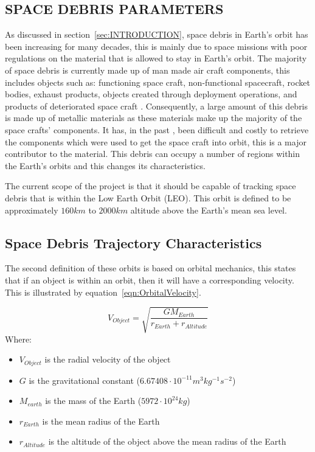 \documentclass[11pt]{witseiepaper}
\begin{document}
\begin{bibunit}[witseie]
\section{SPACE DEBRIS PARAMETERS} \label{sec:SpaceDebrisParameters}
As discussed in section~\ref{sec:INTRODUCTION}, space debris in Earth's orbit has been increasing for many decades, this is mainly due to space missions with poor regulations on the material that is allowed to stay in Earth's orbit.
The majority of space debris is currently made up of man made air craft components, this includes objects such as: functioning space craft, non-functional spacecraft, rocket bodies, exhaust products, objects created through deployment operations, and products of deteriorated space craft \cite{OrbitalDebrisTechnicalAssessment}.
Consequently, a large amount of this debris is made up of metallic materials as these materials make up the majority of the space crafts' components.
It has, in the past \cite{Spacex}, been difficult and costly to retrieve the components which were used to get the space craft into orbit, this is a major contributor to the material.
This debris can occupy a number of regions within the Earth's orbits and this changes its characteristics.

The current scope of the project is that it should be capable of tracking space debris that is within the Low Earth Orbit (LEO). This orbit is defined to be approximately $160 km$ to $2000 km$ altitude above the Earth's mean sea level.


\subsection{Space Debris Trajectory Characteristics} \label{sec:SpaceDebrisTrajectoryCharacteristics}
The second definition of these orbits is based on orbital mechanics, this states that if an object is within an orbit, then it will have a corresponding velocity.
This is illustrated by equation~\ref{eqn:OrbitalVelocity}. 

\begin{equation} \label{eqn:OrbitalVelocity}
    V_{Object} = \sqrt{\frac{G M_{Earth}}{r_{Earth} + r_{Altitude}}}
\end{equation}
Where:
\begin{itemize}
    \item $V_{Object}$ is the radial velocity of the object
    \item $G$ is the gravitational constant ($6.67408 \cdot 10^{-11} m^3 kg^{-1} s^{-2}$)
    \item $M_{earth}$ is the mass of the Earth ($5972 \cdot 10^{24} kg$)
    \item $r_{Earth}$ is the mean radius of the Earth
    \item $r_{Altitude}$ is the altitude of the object above the mean radius of the Earth
\end{itemize}


\end{bibunit}
\end{document}
